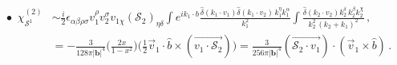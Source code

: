 \begin{align}
\begin{split}
  \\
 \bullet \,\,\, \chi_{\mathcal{S}^1}^{(2)}&\sim \frac{i}{2}\epsilon_{\alpha\beta \rho\sigma}v_1^\rho v_2^\sigma v_{1\chi}(\mathcal{S}_2)_{\eta\delta}\int e^{i k_1\cdot b}\frac{\hat\delta(k_1\cdot v_1)\hat\delta(k_1\cdot v_2)\,k_1^\eta k_1^\alpha}{k_1^2}\int \frac{\hat\delta(k_2\cdot v_2)k_2^\delta\, k_2^\beta k_2^\chi}{k_2^2\,(k_2+k_1)^2}\,,\\ &
 =-\frac{3}{128\pi |\boldsymbol{b}|^4}\Bigg(\frac{2x}{1-x^2}\Bigg)\Bigg(\frac{1}{2}\vec v_1\cdot \hat b\times (\overrightarrow {v_1\cdot \mathcal{S}_2})\Bigg)=\frac{3}{256\pi |\boldsymbol{b}|^4}(\overrightarrow{\mathcal{S}_2\cdot v_1})\cdot (\vec v_1\times \hat b  )\,.\nonumber
\end{split}
\end{align}
